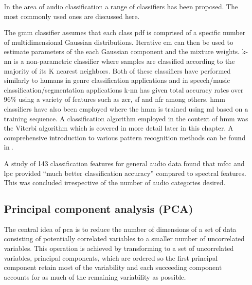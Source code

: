 

In the area of audio classification a range of classifiers has been proposed. The most commonly used ones are discussed here.

The \gls{gmm} classifier assumes that each class pdf is comprised of a specific number of multidimensional Gaussian distributions. Iterative \gls{em} can then be used to estimate parameters of the each Gaussian component and the mixture weights\cite{Tzanetakis2002}. \gls{k-nn} is a non-parametric classifier where samples are classified according to the majority of its K nearest neighbors\cite{Lu2001}. Both of these classifiers have performed similarly to humans in genre classification applications\cite{Tzanetakis2002} and in speech/music classification/segmentation applications \gls{k-nn} has given total accuracy rates over 96\% using a variety of features such as \gls{zcr}, \gls{sf} and \gls{nfr} among others\cite{Lu2002}. \gls{hmm} classifiers have also been employed where the \gls{hmm} is trained using \gls{ml} based on a training sequence\cite{Kimber1997}\cite{Xiong2003}\cite{Burke2013}. A classification algorithm employed in the context of \gls{hmm} was the Viterbi algorithm which is covered in more detail later in this chapter\cite{Kimber1997}\cite{Burke2013}.
A comprehensive introduction to various pattern recognition methods can be found in \cite{Duda2001}.

A study of 143 classification features for general audio data found that \gls{mfcc} and \gls{lpc} provided ``much better classification accuracy'' compared to spectral features\cite{Li2001}. This was concluded irrespective of the number of audio categories desired.

\subsection{Principal component analysis (PCA)}
The central idea of \gls{pca} is to reduce the number of dimensions of a set of data consisting of potentially correlated variables to a smaller number of uncorrelated variables. This operation is achieved by transforming to a set of uncorrelated variables, principal components, which are ordered so the first principal component retain most of the variability and each succeeding component accounts for as much of the remaining variability as possible.

